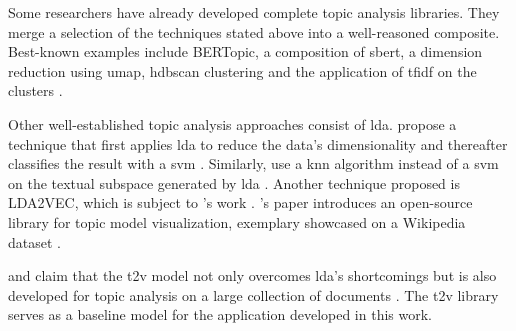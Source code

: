
Some researchers have already developed complete topic analysis libraries.
They merge a selection of the techniques stated above into a well-reasoned composite.
Best-known examples include BERTopic, a composition of \ac{sbert}, a dimension reduction using \ac{umap}, \ac{hdbscan} clustering and the application of \ac{tfidf} on the clusters \cite{bertopic2022}.

Other well-established topic analysis approaches consist of \ac{lda}.
\citeauthor{lda2008} propose a technique that first applies \ac{lda} to reduce the data's dimensionality and thereafter classifies the result with a \ac{svm} \cite{lda2008}.
Similarly, \citeauthor{LDA2016} use a \ac{knn} algorithm instead of a \ac{svm} on the textual subspace generated by \ac{lda} \cite{LDA2016}.
Another technique proposed is LDA2VEC, which is subject to \citeauthor{evolution_of_topic_modeling2022}'s work \cite{evolution_of_topic_modeling2022}.
\citeauthor{topic_modeling2021}'s paper introduces an open-source library for topic model visualization, exemplary showcased on a Wikipedia dataset \cite{topic_modeling2021}.

\citeauthor{Top2Vec2020} and \citeauthor{Topic2Vec2015} claim that the \ac{t2v} model not only overcomes \ac{lda}'s shortcomings \cite{Top2Vec2020, Topic2Vec2015}
but is also developed for topic analysis on a large collection of documents \cite{Top2Vec2020}.
The \ac{t2v} library serves as a baseline model for the application developed in this work.